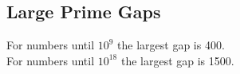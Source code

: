 \subsection{Large Prime Gaps}
For numbers until $10^9$ the largest gap is 400.\\
For numbers until $10^{18}$ the largest gap is 1500.\\[0.5cm]